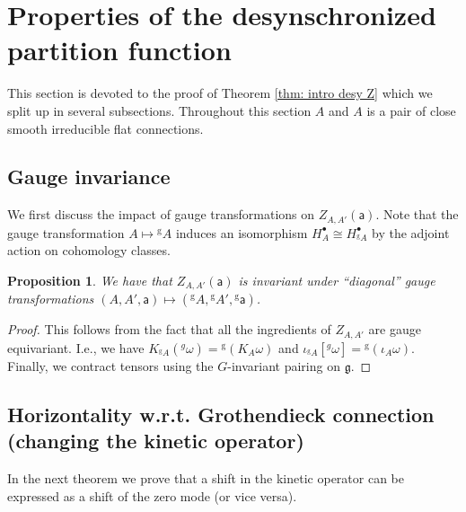 \documentclass[11pt,a4paper]{amsart}
\theoremstyle{plain} %
\newtheorem{prop}[thm]{Proposition}
\theoremstyle{definition}
\theoremstyle{remark}
\newcommand{\g}{\mathfrak{g}}
\newcommand{\Sym}{\operatorname{Sym}}
\newcommand{\sfa}{\mathsf{a}}
\newcommand{\sh}{\mathsf{h}}
\newcommand{\sfg}{\mathrm{g}} %
\begin{document}
{%


\section{Properties of the desynschronized partition function}
This section is devoted to the proof of Theorem \ref{thm: intro desy Z}  %
which we split up in several subsections. Throughout this section $A$ and $A$ is a pair of close smooth irreducible flat connections. 
\subsection{Gauge invariance} 
We first discuss the impact of gauge transformations on $Z_{A,A'}(\sfa)$. Note that the gauge transformation $A \mapsto {}^\sfg A$ induces an isomorphism $H_{A}^\bullet \cong H_{{}^\sfg A}^\bullet$ by the adjoint action on cohomology classes.
\begin{prop}\label{prop: Z desync equivariance under diagonal gauge transf}
     We have that $Z_{A,A'}(\sfa)$ is invariant under ``diagonal'' gauge transformations $(A,A',\sfa) \mapsto ({}^\sfg A,{}^\sfg A',{}^\sfg\sfa)$. 
\end{prop}
\begin{proof}
    This follows from the fact that all the ingredients of $Z_{A,A'}$ are gauge equivariant. I.e., we have $K_{{}^\sfg A}({}^g\omega) = {}^\sfg (K_{A}\omega)$ and $\iota_{{}^\sfg A}[{}^g\omega] = {}^\sfg (\iota_{A}\omega).$ Finally, we contract tensors using the $G$-invariant pairing on $\g$. %
\end{proof}
\subsection{Horizontality w.r.t. Grothendieck connection (changing the kinetic operator)}
In the next theorem we prove that a shift in the kinetic operator can be expressed as a shift of the zero mode (or vice versa). 

}
\end{document}
